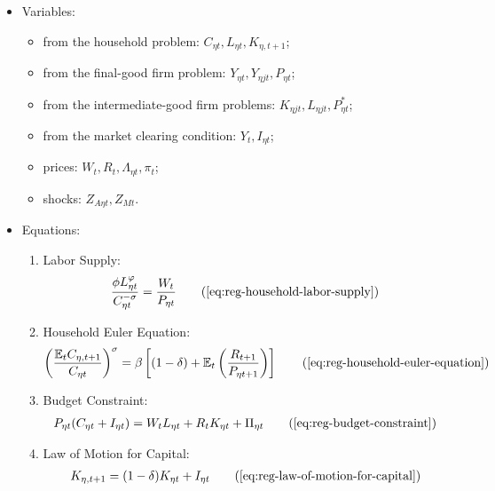 \documentclass[
	thesis.tex
	]{subfiles}
\begin{document}
{\singlespacing
	
	\begin{itemize}
		\item Variables:
		
		\begin{itemize}
			\item from the household problem: $C_{\eta t}, L_{\eta t}, K_{\eta, t+1}$;
			\item from the final-good firm problem: $Y_{\eta t}, Y_{\eta jt}, P_{\eta t}$;
			\item from the intermediate-good firm problems: $K_{\eta jt}, L_{\eta jt}, P_{\eta t}^\ast$;
			\item from the market clearing condition: $Y_t, I_{\eta t}$;
			\item prices: $W_t, R_t, \Lambda_{\eta t}, \pi_t$;
			\item shocks: $Z_{A\eta t}, Z_{Mt}$.
		\end{itemize}
		\item Equations:
		
		\begin{enumerate}
			\item Labor Supply:
			\begin{align}
				\frac{\phi L_{\eta t}^{\varphi}}{C_{\eta t}^{-\sigma}} = \frac{W_t}{P_{\eta t}}
				\tag{\ref{eq:reg-household-labor-supply}}
			\end{align}
			
			\item Household Euler Equation:
			\begin{align}
				\left( \frac{\mathbb{E}_t C_{\eta, t+1}}{C_{\eta t}} \right)^\sigma = \beta \left[ (1-\delta) + \mathbb{E}_t \left(\frac{R_{t+1}}{P_{\eta t+1}}\right) \right]
				\tag{\ref{eq:reg-household-euler-equation}}
			\end{align}
			
			\item Budget Constraint: 
			\begin{align}
				P_{\eta t} (C_{\eta t} + I_{\eta t}) = W_t L_{\eta t} + R_t K_{\eta t} + \Pi_{\eta t}
				\tag{\ref{eq:reg-budget-constraint}}
			\end{align}
			
			\item Law of Motion for Capital:
			\begin{align}
				K_{\eta, t+1} = (1-\delta)K_{\eta t} + I_{\eta t}
				\tag{\ref{eq:reg-law-of-motion-for-capital}}
			\end{align}
			

\end{enumerate}
\end{itemize}}
\end{document}
